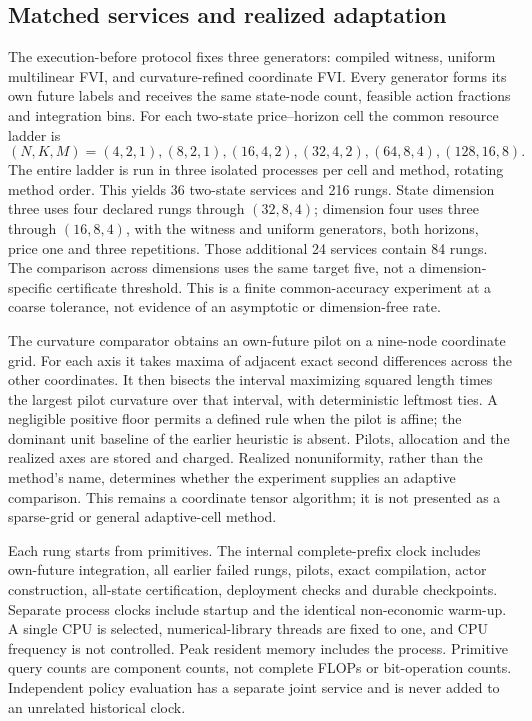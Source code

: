 \subsection{Matched services and realized adaptation}
The execution-before protocol fixes three generators: compiled witness, uniform multilinear FVI, and curvature-refined coordinate FVI. Every generator forms its own future labels and receives the same state-node count, feasible action fractions and integration bins. For each two-state price--horizon cell the common resource ladder is
\[
 (N,K,M)=(4,2,1),(8,2,1),(16,4,2),(32,4,2),(64,8,4),(128,16,8).
\]
The entire ladder is run in three isolated processes per cell and method, rotating method order. This yields 36 two-state services and 216 rungs. State dimension three uses four declared rungs through $(32,8,4)$; dimension four uses three through $(16,8,4)$, with the witness and uniform generators, both horizons, price one and three repetitions. Those additional 24 services contain 84 rungs. The comparison across dimensions uses the same target five, not a dimension-specific certificate threshold. This is a finite common-accuracy experiment at a coarse tolerance, not evidence of an asymptotic or dimension-free rate.

The curvature comparator obtains an own-future pilot on a nine-node coordinate grid. For each axis it takes maxima of adjacent exact second differences across the other coordinates. It then bisects the interval maximizing squared length times the largest pilot curvature over that interval, with deterministic leftmost ties. A negligible positive floor permits a defined rule when the pilot is affine; the dominant unit baseline of the earlier heuristic is absent. Pilots, allocation and the realized axes are stored and charged. Realized nonuniformity, rather than the method's name, determines whether the experiment supplies an adaptive comparison. This remains a coordinate tensor algorithm; it is not presented as a sparse-grid or general adaptive-cell method.

Each rung starts from primitives. The internal complete-prefix clock includes own-future integration, all earlier failed rungs, pilots, exact compilation, actor construction, all-state certification, deployment checks and durable checkpoints. Separate process clocks include startup and the identical non-economic warm-up. A single CPU is selected, numerical-library threads are fixed to one, and CPU frequency is not controlled. Peak resident memory includes the process. Primitive query counts are component counts, not complete FLOPs or bit-operation counts. Independent policy evaluation has a separate joint service and is never added to an unrelated historical clock.

